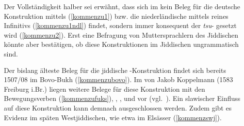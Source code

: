Der Vollständigkeit halber sei erwähnt, dass sich im  kein Beleg für die deutsche Konstruktion mittels  (\ref{kommenzu1}) bzw. die niederländische mittels reines Infinitivs (\ref{kommenzu1ndl}) findet, sondern immer konsequent der \textit{tsu}- gesetzt wird (\ref{kommenzu2}). Erst eine Befragung von Muttersprachlern des Jiddischen könnte aber bestätigen, ob diese Konstruktionen im Jiddischen ungrammatisch sind. 

 



Der bislang älteste Beleg für die jiddische -Konstruktion findet sich bereits 1507/08 im Bovo-Bukh (\ref{kommenzubovo}). Im  von Jakob Koppelmann (1583 Freiburg i.Br.) liegen weitere Belege für diese Konstruktion mit den Bewegungsverben  (\ref{kommenzufuks}), , ,  und  vor (vgl.\, \citealt[XCf]{Schumacher2006}). Ein slawischer Einfluss auf diese Konstruktion kann demnach ausgeschlossen werden. Zudem gibt es Evidenz im späten Westjiddischen, wie etwa im Elsässer \hai{{\SWJ}} (\ref{kommenzswj}). 

